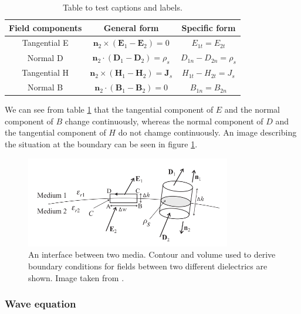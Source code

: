 \begin{table}[h!]
\centering
\begin{tabular}{|c | c | c|} 
 \hline
 Field components & General form & Specific form  \\ [0.5ex] 
 \hline
 Tangential E & $\boldsymbol{n}_2 \times (\boldsymbol{E}_1 - \boldsymbol{E}_2) = 0 $ & $E_{1t} = E_{2t}$ \\ 
 Normal D & $\boldsymbol{n}_2 \cdot (\boldsymbol{D}_1 - \boldsymbol{D}_2) = \rho_s $ & $D_{1n} - D_{2n} = \rho_s$ \\
 Tangential H & $\boldsymbol{n}_2 \times (\boldsymbol{H}_1 - \boldsymbol{H}_2) = \boldsymbol{J}_s $ & $H_{1t} - H_{2t} = J_s$ \\
 Normal B & $\boldsymbol{n}_2 \cdot (\boldsymbol{B}_1 - \boldsymbol{B}_2) = 0 $ & $B_{1n} = B_{2n}$  \\ [1ex] 
 \hline
\end{tabular}
\caption{Table to test captions and labels.}
\label{tab:BCMaxwell}
\end{table}

We can see from table \ref{tab:BCMaxwell} that the tangential component of $E$ and the normal component of $B$ change continuously, whereas the normal component of $D$ and the tangential component of $H$ do not chamge continuously. An image describing the situation at the boundary can be seen in figure \ref{fig:BCMaxwell}.

\begin{figure}[h!]
    \centering
    \includegraphics[width=0.8\textwidth]{figures/BCMaxwell.png}
    \caption{An interface between two media. Contour and volume used to derive boundary conditions for fields between two different dielectrics are shown. Image taken from \cite{wartak2013computational}.}
    \label{fig:BCMaxwell}
\end{figure}

\subsubsection{Wave equation}

